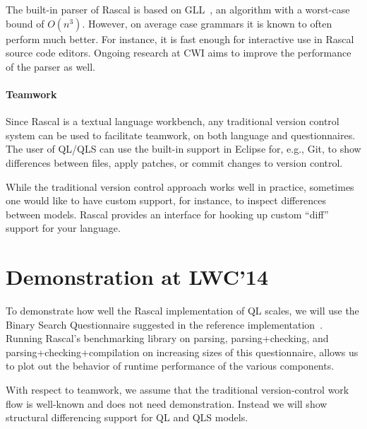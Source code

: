 \documentclass[a4paper]{article}
\begin{document}
The built-in parser of Rascal is based on GLL~\cite{GLLPTGEN}, an
algorithm with a worst-case bound of $O(n^3)$. However, on average
case grammars it is known to often perform much better. For instance,
it is fast enough for interactive use in Rascal source code editors.
Ongoing research at CWI aims to improve the performance of the parser
as well.


\paragraph{Teamwork}
Since Rascal is a textual language workbench, any traditional version
control system can be used to facilitate teamwork, on both language and
questionnaires. The user of QL/QLS can use the built-in support in
Eclipse for, e.g., Git, to show differences between files, apply
patches, or commit changes to version control. 

While the traditional version control approach works well in practice,
sometimes one would like to have custom support, for instance, to
inspect differences between models. Rascal provides an interface for
hooking up custom ``diff'' support for your language. 


\section{Demonstration at LWC'14}

To demonstrate how well the Rascal implementation of QL scales, we will
use the Binary Search Questionnaire suggested in the reference
implementation~\cite{ReferenceImpl}. Running Rascal's benchmarking
library on parsing, parsing+checking, and parsing+checking+compilation
on increasing sizes of this questionnaire, allows us to plot out the
behavior of runtime performance of the various components. 

With respect to teamwork, we assume that the traditional
version-control work flow is well-known and does not need
demonstration. Instead we will show structural differencing support
for QL and QLS models.



\end{document}

